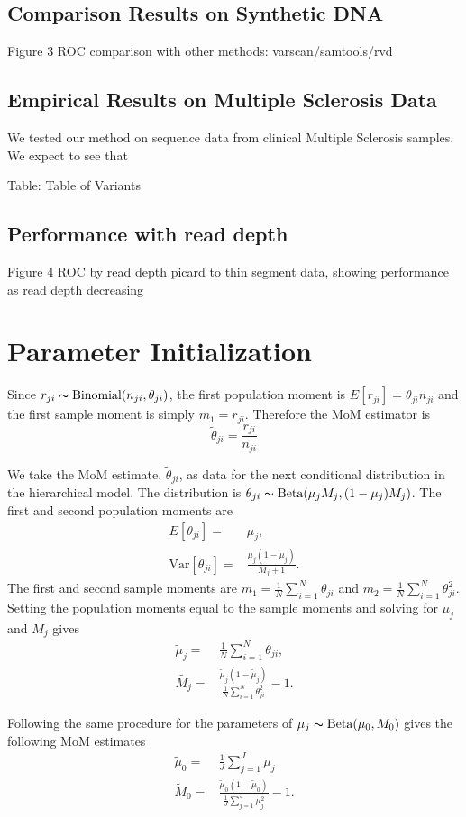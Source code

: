 \documentclass[11pt,reqno]{amsart}
\begin{document}
\subsection{Comparison Results on Synthetic DNA}
Figure 3 ROC comparison with other methods: varscan/samtools/rvd
\subsection{Empirical Results on Multiple Sclerosis Data}
We tested our method on sequence data from clinical Multiple Sclerosis samples. We expect to see that 

Table: Table of Variants
\subsection{Performance with read depth}
Figure 4 ROC by read depth
picard to thin segment data, showing performance as read depth decreasing

\appendix
\section{Parameter Initialization}\label{sec:appendix_mom}
Since $r_{ji} \thicksim \text{Binomial}(n_{ji}, \theta_{ji})$, the first population moment is  $E[r_{ji}] = \theta_{ji} n_{ji}$ and the first sample moment is simply $m_1 = r_{ji}$. Therefore the MoM estimator is 
\begin{equation}
	\tilde{\theta}_{ji} = \frac{r_{ji}} {n_{ji}}
\end{equation}

We take the MoM estimate, $\tilde{\theta}_{ji}$, as data for the next conditional distribution in the hierarchical model. The distribution is $\theta_{ji} \thicksim \text{Beta}(\mu_jM_j, (1-\mu_j)M_j)$. The first and second population moments are
\begin{eqnarray}
	E[\theta_{ji}] =& \mu_j,\\
	\text{Var}[\theta_{ji}] =& \frac{\mu_j(1-\mu_j)} { M_j + 1 }.
\end{eqnarray}
The first and second sample moments are $m_1 = \frac{1}{N}\sum_{i=1}^N \theta_{ji}$ and $m_2 = \frac{1}{N}\sum_{i=1}^N \theta_{ji}^2$. Setting the population moments equal to the sample moments and solving for $\mu_j$ and $M_j$ gives
\begin{eqnarray}
	\tilde{\mu}_j =& \frac{1}{N} \sum_{i=1}^N \theta_{ji}, \\
	\tilde{M_j} =& \frac{ \tilde{\mu}_j (1 - \tilde{\mu}_j ) } { \frac{1}{N} \sum_{i=1}^N \theta_{ji}^2 } -1.
\end{eqnarray}

Following the same procedure for the parameters of $\mu_j \thicksim \text{Beta}(\mu_0, M_0)$ gives the following MoM estimates
\begin{eqnarray}
	\tilde{\mu}_0 =& \frac{1}{J} \sum_{j=1}^J \mu_j \\
	\tilde{M}_0 =& \frac{ \tilde{\mu}_0 (1 - \tilde{\mu}_0 ) } {\frac{1}{J} \sum_{j=1}^J \mu_j^2 } -1.
\end{eqnarray}



\end{document}
